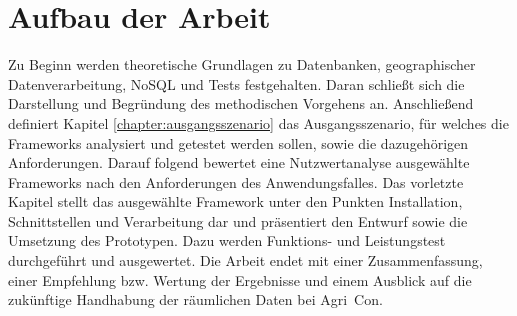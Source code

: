 \section{Aufbau der Arbeit}


Zu Beginn werden theoretische Grundlagen zu Datenbanken, geographischer Datenverarbeitung, NoSQL und Tests festgehalten.
Daran schließt sich die Darstellung und Begründung des methodischen Vorgehens an.
Anschließend definiert Kapitel \ref{chapter:ausgangsszenario} das Ausgangsszenario, für welches die Frameworks analysiert und getestet werden sollen, sowie die dazugehörigen Anforderungen.
Darauf folgend bewertet eine Nutzwertanalyse ausgewählte Frameworks nach den Anforderungen des Anwendungsfalles.
Das vorletzte Kapitel stellt das ausgewählte Framework unter den Punkten Installation, Schnittstellen und Verarbeitung dar und präsentiert den Entwurf sowie die Umsetzung des Prototypen.
Dazu werden Funktions- und Leistungstest durchgeführt und ausgewertet.
Die Arbeit endet mit einer Zusammenfassung, einer Empfehlung bzw. Wertung der Ergebnisse und einem Ausblick auf die zukünftige Handhabung der räumlichen Daten bei Agri~Con.